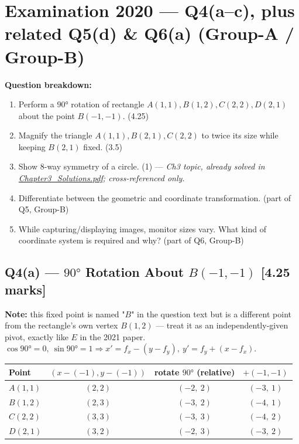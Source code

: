 \documentclass[12pt, a4paper]{article}
\newenvironment{solutionbox}{\begin{mdframed}[style=solutionframe]}{\end{mdframed}}
\begin{document}
\section{Examination 2020 --- Q4(a--c), plus related Q5(d) \& Q6(a) (Group-A / Group-B)}
\begin{solutionbox}
\textbf{Question breakdown:}
\begin{enumerate}[noitemsep]
  \item[Q4(a)] Perform a $90°$ rotation of rectangle $A(1,1), B(1,2), C(2,2), D(2,1)$ about the point $B(-1,-1)$. (4.25)
  \item[Q4(b)] Magnify the triangle $A(1,1), B(2,1), C(2,2)$ to twice its size while keeping $B(2,1)$ fixed. (3.5)
  \item[Q4(c)] Show 8-way symmetry of a circle. (1) --- \emph{Ch3 topic, already solved in \href{run:./Chapter3_Solutions.pdf}{Chapter3\_Solutions.pdf}; cross-referenced only.}
  \item[Q5(d)] Differentiate between the geometric and coordinate transformation. (part of Q5, Group-B)
  \item[Q6(a)] While capturing/displaying images, monitor sizes vary. What kind of coordinate system is required and why? (part of Q6, Group-B)
\end{enumerate}
\end{solutionbox}

\subsection*{Q4(a) --- $90°$ Rotation About $B(-1,-1)$ [4.25 marks]}
\textbf{Note:} this fixed point is named "$B$" in the question text but is a different point from the rectangle's own vertex $B(1,2)$ --- treat it as an independently-given pivot, exactly like $E$ in the 2021 paper. $\cos90°=0,\ \sin90°=1\Rightarrow x'=f_x-(y-f_y),\ y'=f_y+(x-f_x)$.
\begin{solutionbox}
\begin{center}
\begin{tabular}{lccc}
\toprule
Point & $(x-(-1),y-(-1))$ & rotate $90°$ (relative) & $+(-1,-1)$ \\
\midrule
$A(1,1)$ & $(2,2)$ & $(-2,\ 2)$ & $(-3,\ 1)$ \\
$B(1,2)$ & $(2,3)$ & $(-3,\ 2)$ & $(-4,\ 1)$ \\
$C(2,2)$ & $(3,3)$ & $(-3,\ 3)$ & $(-4,\ 2)$ \\
$D(2,1)$ & $(3,2)$ & $(-2,\ 3)$ & $(-3,\ 2)$ \\
\bottomrule
\end{tabular}
\end{center}
\end{solutionbox}
\end{document}

